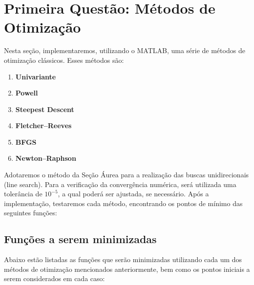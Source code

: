 \documentclass[a4paper, 12pt]{article}
\begin{document}
\newpage
\section{Primeira Questão: Métodos de Otimização}

Nesta seção, implementaremos, utilizando o MATLAB, uma série de métodos de otimização clássicos. Esses métodos são:

\begin{enumerate}
\item \textbf{Univariante}
\item \textbf{Powell}
\item \textbf{Steepest Descent}
\item \textbf{Fletcher–Reeves}
\item \textbf{BFGS}
\item \textbf{Newton–Raphson}
\end{enumerate}

Adotaremos o método da Seção Áurea para a realização das buscas unidirecionais (line search). Para a verificação da convergência numérica, será utilizada uma tolerância de $10^{-5}$, a qual poderá ser ajustada, se necessário. Após a implementação, testaremos cada método, encontrando os pontos de mínimo das seguintes funções:

\subsection{Funções a serem minimizadas}

Abaixo estão listadas as funções que serão minimizadas utilizando cada um dos métodos de otimização mencionados anteriormente, bem como os pontos iniciais a serem considerados em cada caso:
\end{document}
